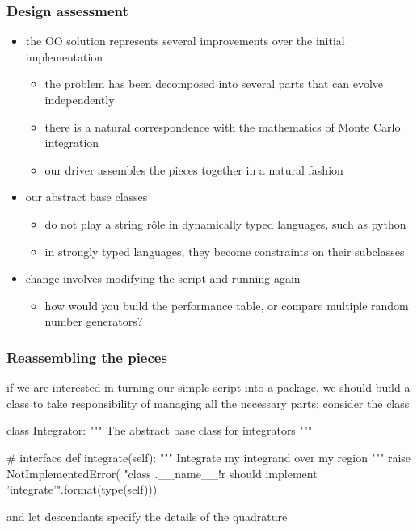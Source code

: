 %
%


\begin{frame}[fragile]
%
  \frametitle{Design assessment}
%
  \begin{itemize}
%
  \item the OO solution represents several improvements over the initial implementation
    \begin{itemize}
    \item the problem has been decomposed into several parts that can evolve independently
    \item there is a natural correspondence with the mathematics of Monte Carlo integration 
    \item our driver assembles the pieces together in a natural fashion
    \end{itemize}
%
  \item our abstract base classes
    \begin{itemize}
      \item do not play a string r\^ole in dynamically typed languages, such as python
      \item in strongly typed languages, they become constraints on their subclasses
    \end{itemize}
%
  \item change involves modifying the script and running again
    \begin{itemize}
    \item how would you build the performance table, or compare multiple random number
      generators?
    \end{itemize}
%
  \end{itemize}
%
\end{frame}

\begin{frame}[fragile]
%
  \frametitle{Reassembling the pieces}
%
  if we are interested in turning our simple script into a package, we should build a class to
  take responsibility of managing all the necessary parts; consider the class
%
  \begin{ipython}{}
class Integrator:
    """
    The abstract base class for integrators
    """

    # interface
    def integrate(self):
        """
        Integrate my {integrand} over my {region}
        """
        raise NotImplementedError(
            "class {.__name__!r} should implement 'integrate'".format(type(self)))
  \end{ipython}
%
  and let descendants specify the details of the quadrature
%
\end{frame}

